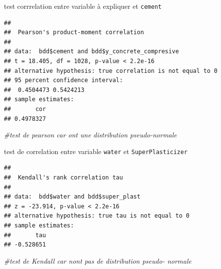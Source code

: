 \documentclass[
  12pt,
]{article}
\newenvironment{Shaded}{\begin{snugshade}}{\end{snugshade}}
\newcommand{\AttributeTok}[1]{\textcolor[rgb]{0.13,0.29,0.53}{#1}}
\newcommand{\CommentTok}[1]{\textcolor[rgb]{0.56,0.35,0.01}{\textit{#1}}}
\newcommand{\FunctionTok}[1]{\textcolor[rgb]{0.13,0.29,0.53}{\textbf{#1}}}
\newcommand{\NormalTok}[1]{#1}
\newcommand{\SpecialCharTok}[1]{\textcolor[rgb]{0.81,0.36,0.00}{\textbf{#1}}}
\newcommand{\StringTok}[1]{\textcolor[rgb]{0.31,0.60,0.02}{#1}}
\begin{document}
test corrrelation entre variable à expliquer et \texttt{cement}

\begin{Shaded}
\end{Shaded}

\begin{verbatim}
## 
##  Pearson's product-moment correlation
## 
## data:  bdd$cement and bdd$y_concrete_compresive
## t = 18.405, df = 1028, p-value < 2.2e-16
## alternative hypothesis: true correlation is not equal to 0
## 95 percent confidence interval:
##  0.4504473 0.5424213
## sample estimates:
##       cor 
## 0.4978327
\end{verbatim}

\begin{Shaded}
\begin{Highlighting}[]
\CommentTok{\#test de pearson car ont une distribution pseudo{-}normale}
\end{Highlighting}
\end{Shaded}

test de correlation entre variable \texttt{water} et
\texttt{SuperPlasticizer}

\begin{Shaded}
\end{Shaded}

\begin{verbatim}
## 
##  Kendall's rank correlation tau
## 
## data:  bdd$water and bdd$super_plast
## z = -23.914, p-value < 2.2e-16
## alternative hypothesis: true tau is not equal to 0
## sample estimates:
##       tau 
## -0.528651
\end{verbatim}

\begin{Shaded}
\begin{Highlighting}[]
\CommentTok{\#test de Kendall car n\textquotesingle{}ont pas de distribution pseudo{-} normale}
\end{Highlighting}
\end{Shaded}
\end{document}

